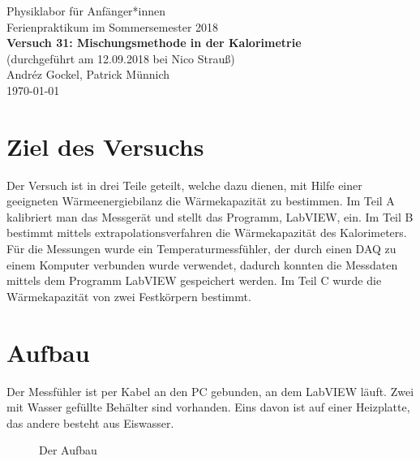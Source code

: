 \documentclass[11pt,a4paper]{article}
\begin{document}
{
\centering 
\large 
Physiklabor für Anf\"anger*innen \\
Ferienpraktikum im Sommersemester 2018 \\[4mm]
\textbf{\LARGE 
Versuch 31: Mischungsmethode in der Kalorimetrie
} \\[3mm]
(durchgef\"uhrt am 12.09.2018 bei Nico Strauß) \\
Andréz Gockel, Patrick M\"unnich\\
\today \\[10mm]
}

\tableofcontents

\pagebreak

\section{Ziel des Versuchs}


Der Versuch ist in drei Teile geteilt, welche dazu dienen, mit Hilfe einer geeigneten Wärmeenergiebilanz die Wärmekapazität zu bestimmen. Im Teil A kalibriert man das Messgerät und stellt das Programm, LabVIEW, ein. Im Teil B bestimmt mittels extrapolationsverfahren die Wärmekapazität des Kalorimeters. Für die Messungen wurde ein Temperaturmessfühler, der durch einen DAQ zu einem Komputer verbunden wurde verwendet, dadurch konnten die Messdaten mittels dem Programm LabVIEW gespeichert werden. Im Teil C wurde die Wärmekapazität von zwei Festkörpern bestimmt. 

\section{Aufbau}

Der Messf\"uhler ist per Kabel an den PC gebunden, an dem LabVIEW l\"auft. Zwei mit Wasser gef\"ullte Beh\"alter sind vorhanden. Eins davon ist auf einer Heizplatte, das andere besteht aus Eiswasser.

\begin{figure}[ht!]
	\centering
  	\renewcommand\thefigure{B1}
	\caption{Der Aufbau}
	\label{Bild:1}
\end{figure}
\end{document}
